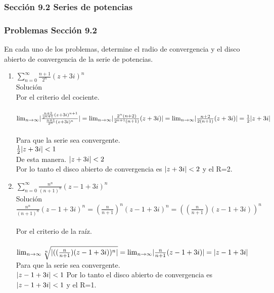 	\subsubsection* {Secci\'on 9.2 Series de potencias}
	\subsubsection* {Problemas Secci\'on 9.2}
\justify
En cada uno de los problemas, determine el radio de convergencia y el disco abierto de convergencia de la serie de potencias.
\begin{enumerate}
\item $\sum\limits_{n=0}^\infty\frac{n+1}{2^n}(z+3i)^n$\\
Soluci\'on\\
Por el criterio del cociente.\\ \\
$\lim_{n \to \infty}\lvert\frac{\frac{n+2}{2^{n+1}}(z+3i)^{n+1}}{\frac{n+1}{2^n}(z+3i)^n}\rvert= \lim_{n \to \infty}\lvert\frac{2^n(n+2)}{2^{n+1}(n+1)}(z+3i)\rvert= \lim_{n \to \infty}\lvert\frac{n+2}{2(n+1)}(z+3i)\rvert=\frac{1}{2}\lvert z+3i\rvert$\\ \\
Para que la serie sea convergente.\\
$\frac{1}{2}\lvert z+3i\rvert < 1$\\ 
De esta manera.
$\lvert z+3i\rvert < 2$\\
Por lo tanto el disco abierto de convergencia es $\lvert z+3i\rvert < 2$ y el R=2.

\item $\sum\limits_{n=0}^\infty\frac{n^n}{(n+1)^n}(z-1+3i)^n$\\
Soluci\'on\\
$\frac{n^n}{(n+1)^n}(z-1+3i)^n = (\frac{n}{n+1})^n(z-1+3i)^n = ((\frac{n}{n+1})(z-1+3i))^n$\\ \\
Por el criterio de la ra\'iz.\\ \\
$\lim_{n \to \infty}\sqrt[n]{\lvert((\frac{n}{n+1})(z-1+3i))^n\rvert}=\lim_{n \to \infty}\lvert\frac{n}{n+1}(z-1+3i)\rvert = \lvert z-1+3i\rvert$\\
Para que la serie sea convergente.\\
$\lvert z-1+3i\rvert<1$
Por lo tanto el disco abierto de convergencia es $\lvert z-1+3i\rvert < 1$ y el R=1.


\end{enumerate}
